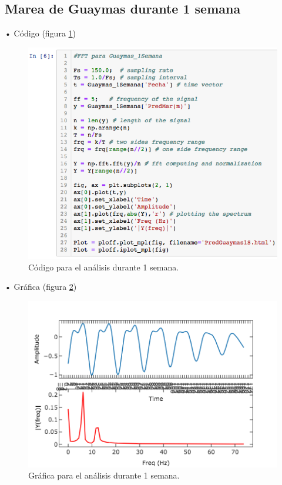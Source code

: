 \documentclass[12pt]{article}
\begin{document}
\subsection{Marea de Guaymas durante 1 semana}

\noindent • Código (figura \ref{fig:cod-1s}) \\

\begin{figure}[h!]
	\center
	\includegraphics[scale=.6]{./Images/cod-1s}
	\caption{\label{fig:cod-1s} Código para el análisis durante 1 semana.}
\end{figure}

\noindent • Gráfica (figura \ref{fig:graf-1s}) \\

\begin{figure}[h!]
	\center
	\includegraphics[scale=.6]{./Images/graf-1s}
	\caption{\label{fig:graf-1s} Gráfica para el análisis durante 1 semana.}
\end{figure}
\end{document}
